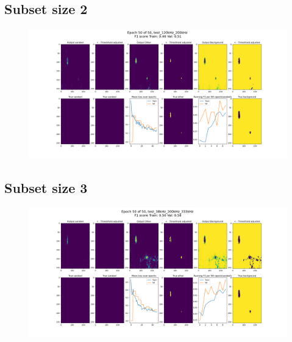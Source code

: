     \subsection{Subset size 2}
        \begin{figure}[H]

            \hspace*{-3.2cm}
            \includegraphics[scale=0.45]{figures/epoch_50_test_120kHz_200kHz.png}

          	\medskip 
        \end{figure}
    \clearpage
    \subsection{Subset size 3}
        \begin{figure}[H]

            \hspace*{-3.2cm}
            \includegraphics[scale=0.45]{figures/epoch_50_test_38kHz_200kHz_333kHz.png}

          	\medskip 
        \end{figure}
    \clearpage
